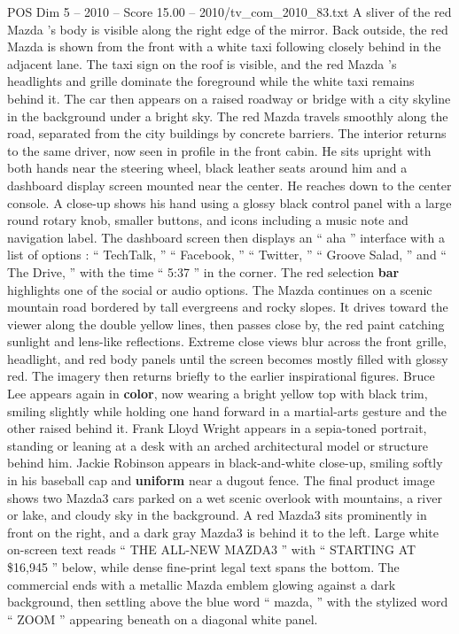 \begin{textsample}{POS Dim 5 – 2010 – Score 15.00 – 2010/tv\_com\_2010\_83.txt}
A sliver of the red Mazda ’s body is visible along the right edge of the mirror.
Back outside, the red Mazda is shown from the front with a white taxi following closely behind in the adjacent lane.
The taxi sign on the roof is visible, and the red Mazda ’s headlights and grille dominate the foreground while the white taxi remains behind it.
The car then appears on a raised roadway or bridge with a city skyline in the background under a bright sky.
The red Mazda travels smoothly along the road, separated from the city buildings by concrete barriers.
The interior returns to the same driver, now seen in profile in the front cabin.
He sits upright with both hands near the steering wheel, black leather seats around him and a dashboard display screen mounted near the center.
He reaches down to the center console.
A close-up shows his hand using a glossy black control panel with a large round rotary knob, smaller buttons, and icons including a music note and navigation label.
The dashboard screen then displays an “ aha ” interface with a list of options : “ TechTalk, ” “ Facebook, ” “ Twitter, ” “ Groove Salad, ” and “ The Drive, ” with the time “ 5:37 ” in the corner.
The red selection \textbf{bar} highlights one of the social or audio options.
The Mazda continues on a scenic mountain road bordered by tall evergreens and rocky slopes.
It drives toward the viewer along the double yellow lines, then passes close by, the red paint catching sunlight and lens-like reflections.
Extreme close views blur across the front grille, headlight, and red body panels until the screen becomes mostly filled with glossy red.
The imagery then returns briefly to the earlier inspirational figures.
Bruce Lee appears again in \textbf{color}, now wearing a bright yellow top with black trim, smiling slightly while holding one hand forward in a martial-arts gesture and the other raised behind it.
Frank Lloyd Wright appears in a sepia-toned portrait, standing or leaning at a desk with an arched architectural model or structure behind him.
Jackie Robinson appears in black-and-white close-up, smiling softly in his baseball cap and \textbf{uniform} near a dugout fence.
The final product image shows two Mazda3 cars parked on a wet scenic overlook with mountains, a river or lake, and cloudy sky in the background.
A red Mazda3 sits prominently in front on the right, and a dark gray Mazda3 is behind it to the left.
Large white on-screen text reads “ THE ALL-NEW MAZDA3 ” with “ STARTING AT \$16,945 ” below, while dense fine-print legal text spans the bottom.
The commercial ends with a metallic Mazda emblem glowing against a dark background, then settling above the blue word “ mazda, ” with the stylized word “ ZOOM ” appearing beneath on a diagonal white panel.

\end{textsample}
